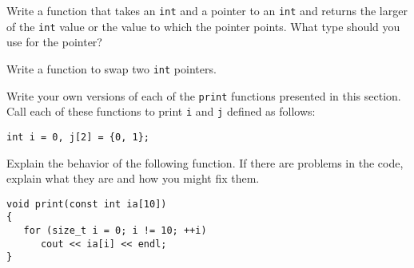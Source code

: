 %
%
\begin{question}
Write a function that takes an \verb|int| and a pointer to an \verb|int|
and returns the larger of the \verb|int| value or the value to which the pointer
points. What type should you use for the pointer?
\end{question}

\begin{question}
Write a function to swap two \verb|int| pointers.
\end{question}

\begin{question}
Write your own versions of each of the \verb|print| functions
presented in this section. Call each of these functions to print \verb|i| and \verb|j| defined as follows:
\begin{lstlisting}
int i = 0, j[2] = {0, 1};
\end{lstlisting}
\end{question}

\begin{question}
Explain the behavior of the following function. If there are
problems in the code, explain what they are and how you might fix them.
\begin{lstlisting}
void print(const int ia[10])
{
   for (size_t i = 0; i != 10; ++i)
      cout << ia[i] << endl;
}
\end{lstlisting}
\end{question}
